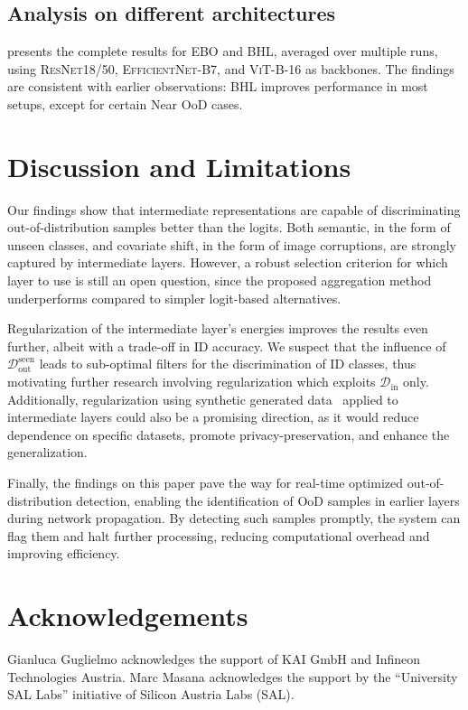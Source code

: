 \documentclass[10pt,twocolumn,a4paper]{article}
\begin{document}
\subsection{Analysis on different architectures}
 presents the complete results for EBO and BHL, averaged over multiple runs, using \textsc{ResNet18/50}, \textsc{EfficientNet-B7}, and \textsc{ViT-B-16} as backbones. The findings are consistent with earlier observations: BHL improves performance in most setups, except for certain Near OoD cases.

\section{Discussion and Limitations}\label{sec:discussion}

Our findings show that intermediate representations are capable of discriminating out-of-distribution samples better than the logits. Both semantic, in the form of unseen classes, and covariate shift, in the form of image corruptions, are strongly captured by intermediate layers. However, a robust selection criterion for which layer to use is still an open question, since the proposed aggregation method underperforms compared to simpler logit-based alternatives.

Regularization of the intermediate layer's energies improves the results even further, albeit with a trade-off in ID accuracy. We suspect that the influence of $\mathcal{D}_{\text{out}}^{\text{seen}}$ leads to sub-optimal filters for the discrimination of ID classes, thus motivating further research involving regularization which exploits $\mathcal{D}_{\text{in}}$ only. Additionally, regularization using synthetic generated data~\cite{zhu2023diversified} applied to intermediate layers could also be a promising direction, as it would reduce dependence on specific datasets, promote privacy-preservation, and enhance the generalization.

Finally, the findings on this paper pave the way for real-time optimized out-of-distribution detection, enabling the identification of OoD samples in earlier layers during network propagation. By detecting such samples promptly, the system can flag them and halt further processing, reducing computational overhead and improving efficiency.

\section*{Acknowledgements}
Gianluca Guglielmo acknowledges the support of KAI GmbH and Infineon Technologies Austria.
Marc Masana acknowledges the support by the “University SAL Labs” initiative of Silicon Austria Labs (SAL).

{
    \small
    
    
}
\end{document}
